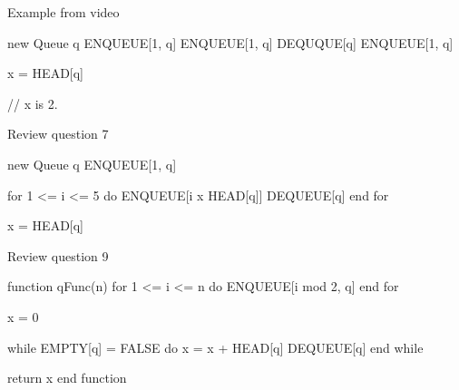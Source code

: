 Example from video

new Queue q
ENQUEUE[1, q]
ENQUEUE[1, q]
DEQUQUE[q]
ENQUEUE[1, q]

x = HEAD[q]

// x is 2.

Review question 7

new Queue q
ENQUEUE[1, q]

for 1 <= i <= 5 do
  ENQUEUE[i x HEAD[q]]
  DEQUEUE[q]
end for

x = HEAD[q]

Review question 9

function qFunc(n)
  for 1 <= i <= n do
    ENQUEUE[i mod 2, q]
  end for

  x = 0

  while EMPTY[q] = FALSE do
    x = x + HEAD[q]
    DEQUEUE[q]
  end while

  return x
end function
